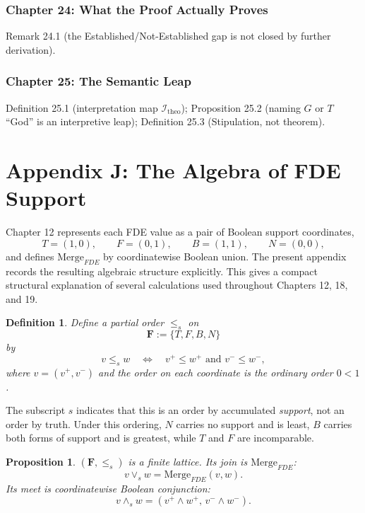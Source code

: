 \documentclass[11pt]{book}
\newtheorem*{appendixdefinition}{Definition}
\newtheorem*{appendixproposition}{Proposition}
\begin{document}
\subsection*{Chapter 24: What the Proof Actually Proves}
Remark 24.1 (the Established/Not-Established gap is not closed by further derivation).

\subsection*{Chapter 25: The Semantic Leap}
Definition 25.1 (interpretation map $\mathcal I_{\mathrm{theo}}$); Proposition 25.2 (naming $G$ or $T$ ``God'' is an interpretive leap); Definition 25.3 (Stipulation, not theorem).



\chapter*{Appendix J: The Algebra of FDE Support}

Chapter 12 represents each FDE value as a pair of Boolean support
coordinates,
\[
T=(1,0),\qquad
F=(0,1),\qquad
B=(1,1),\qquad
N=(0,0),
\]
and defines $\mathrm{Merge}_{FDE}$ by coordinatewise Boolean union.
The present appendix records the resulting algebraic structure explicitly.
This gives a compact structural explanation of several calculations used
throughout Chapters 12, 18, and 19.

\begin{appendixdefinition}
Define a partial order $\leq_s$ on
\[
\mathbf F:=\{T,F,B,N\}
\]
by
\[
v\leq_s w
\quad\Longleftrightarrow\quad
v^+\leq w^+
\text{ and }
v^-\leq w^-,
\]
where $v=(v^+,v^-)$ and the order on each coordinate is the ordinary order
$0<1$.
\end{appendixdefinition}

The subscript $s$ indicates that this is an order by accumulated
\emph{support}, not an order by truth. Under this ordering, $N$ carries no
support and is least, $B$ carries both forms of support and is greatest,
while $T$ and $F$ are incomparable.

\begin{appendixproposition}
$(\mathbf F,\leq_s)$ is a finite lattice. Its join is
$\mathrm{Merge}_{FDE}$:
\[
v\vee_s w
=
\mathrm{Merge}_{FDE}(v,w).
\]
Its meet is coordinatewise Boolean conjunction:
\[
v\wedge_s w
=
(v^+\wedge w^+,\,v^-\wedge w^-).
\]
\end{appendixproposition}
\end{document}
